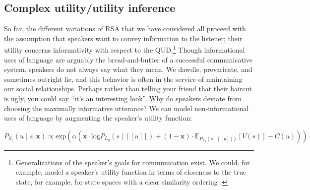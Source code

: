 \documentclass{sp}
\newcommand{\sem}[1]{\ensuremath{[\![#1]\!]}}
\begin{document}
\subsection{Complex utility/utility inference}
 
 So far, the different variations of RSA that we have considered all proceed with the assumption that speakers want to convey information to the listener; their utility concerns informativity with respect to the QUD.\footnote{Generalizations of the speaker's goals for communication exist. We could, for example, model a speaker's utility function in terms of closeness to the true state, for example, for state spaces with a clear similarity ordering \citep{Franke2014:Typical-use-of-}.} Though informational uses of language are arguably the bread-and-butter of a successful communicative system, speakers do not always say what they mean. We dawdle, prevaricate, and sometimes outright lie, and this behavior is often in the service of maintaining our social relationships. Perhaps rather than telling your friend that their haircut is ugly, you could say ``it's an interesting look''. Why do speakers deviate from choosing the maximally informative utterance? We can model non-informational uses of language by augmenting the speaker's utility function: 
  
 \begin{equation} \label{S1-polite}
P_{S_1}(u\mid s, \textbf{x}) \propto \textrm{exp}(\alpha  (
 \textbf{x} \cdot \textrm{log}P_{L_0}(s \mid \sem{u}) + 
 (1 - \textbf{x}) \cdot  \mathbb{E}_{P_{L_0}(s \mid \sem{u})}[V(s)] - C(u)))
\end{equation}
\end{document}
